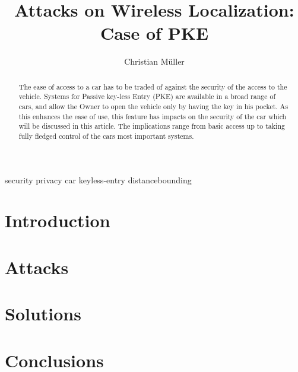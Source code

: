 \documentclass[draft,a4paper]{IEEEtran}
\title{Attacks on Wireless Localization: Case of PKE}
\author{Christian Müller}
\begin{document}
\maketitle
\begin{IEEEkeywords}
security privacy car keyless-entry distancebounding
\end{IEEEkeywords}


\begin{abstract}
The ease of access to a car has to be traded of against the security of the
access to the vehicle.
Systems for Passive key-less Entry (PKE) are available in a broad range of cars,
and allow the Owner to open the vehicle only by having the key in his pocket.
As this enhances the ease of use, this feature has impacts on the security of
the car which will be discussed in this article. The implications range from 
basic access up to taking fully fledged control of the cars most important
systems.
\end{abstract}

\section{Introduction}
	

\section{Attacks}
	

\section{Solutions}


\section{Conclusions}
\end{document}
